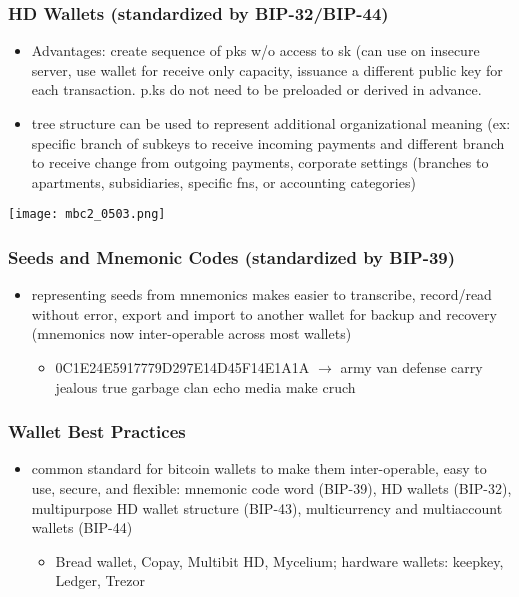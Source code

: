 \documentclass[english, 11pt]{article}
\begin{document}
\subsubsection{HD Wallets (standardized by BIP-32/BIP-44)}
\begin{itemize}
    \item Advantages: create sequence of pks w/o access to sk (can use on insecure server, use wallet for receive only capacity, issuance a different public key for each transaction. p.ks do not need to be preloaded or derived in advance.
    \item tree structure can be used to represent additional organizational meaning (ex: specific branch of subkeys to receive incoming payments and different branch to receive change from outgoing payments, corporate settings (branches to apartments, subsidiaries, specific fns, or accounting categories)
\end{itemize}
\texttt{[image: mbc2\_0503.png]}
\subsubsection{Seeds and Mnemonic Codes (standardized by BIP-39)}
\begin{itemize}
    \item representing seeds from mnemonics makes easier to transcribe, record/read without error, export and import to another wallet for backup and recovery (mnemonics now inter-operable across most wallets)
    \begin{itemize}
        \item 0C1E24E5917779D297E14D45F14E1A1A $\rightarrow$ army van defense carry jealous true garbage clan echo media make cruch
    \end{itemize}
\end{itemize}
\subsubsection{Wallet Best Practices}
\begin{itemize}
    \item common standard for bitcoin wallets to make them inter-operable, easy to use, secure, and flexible: mnemonic code word (BIP-39), HD wallets (BIP-32), multipurpose HD wallet structure (BIP-43), multicurrency and multiaccount wallets (BIP-44)
    \begin{itemize}
        \item Bread wallet, Copay, Multibit HD, Mycelium; hardware wallets: keepkey, Ledger, Trezor
    \end{itemize}
\end{itemize}
\end{document}
